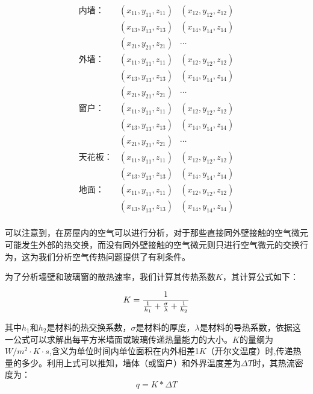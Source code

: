 \documentclass{my_paper}
\begin{document}
\begin{equation}
    \begin{aligned}
        \text{内墙：}&(x_{11},y_{11},z_{11})&(x_{12},y_{12},z_{12})\\
                    &(x_{13},y_{13},z_{13})&(x_{14},y_{14},z_{14})\\
                    &(x_{21},y_{21},z_{21})&\cdots \\
        \text{外墙：}&(x_{11},y_{11},z_{11})&(x_{12},y_{12},z_{12})\\
        &(x_{13},y_{13},z_{13})&(x_{14},y_{14},z_{14})\\
        &(x_{21},y_{21},z_{21})&\cdots \\
        \text{窗户：}&(x_{11},y_{11},z_{11})&(x_{12},y_{12},z_{12})\\
        &(x_{13},y_{13},z_{13})&(x_{14},y_{14},z_{14})\\
        &(x_{21},y_{21},z_{21})&\cdots \\
        \text{天花板：}&(x_{11},y_{11},z_{11})&(x_{12},y_{12},z_{12})\\
        &(x_{13},y_{13},z_{13})&(x_{14},y_{14},z_{14})\\
        \text{地面：}&(x_{11},y_{11},z_{11})&(x_{12},y_{12},z_{12})\\
        &(x_{13},y_{13},z_{13})&(x_{14},y_{14},z_{14})\\
    \end{aligned}
    \label{fw}
\end{equation}

可以注意到，在房屋内的空气可以进行分析，对于那些直接同外壁接触的空气微元可能发生外部的热交换，而没有同外壁接触的空气微元则只进行空气微元的交换行为，这为我们分析空气传热问题提供了有利条件。

为了分析墙壁和玻璃窗的散热速率，我们计算其传热系数$K$\cite{1}，其计算公式如下：

\begin{equation}
    \large K = \frac{1}{\frac{1}{h_1}+\frac{\sigma}{\lambda}+\frac{1}{h_2}}
    \label{16}
\end{equation}

其中$h_1$和$ h_2 $是材料的热交换系数，$ \sigma $是材料的厚度，$ \lambda $是材料的导热系数，依据这一公式可以求解出每平方米墙面或玻璃传递热量能力的大小。$K$的量纲为$W/m^2\cdot K \cdot s$,含义为单位时间内单位面积在内外相差1$K$（开尔文温度）时,传递热量的多少。利用上式可以推知，墙体（或窗户）和外界温度差为$\Delta T$时，其热流密度为：
\begin{equation}
    q = K * \Delta T
    \label{17}
\end{equation}
\end{document}
